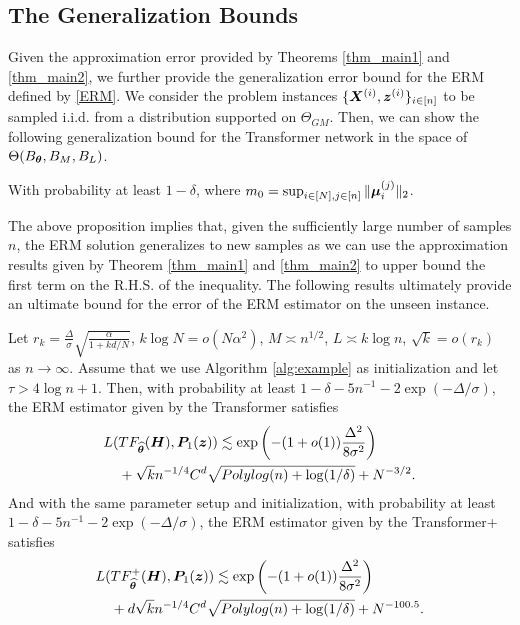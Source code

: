 \subsection{The Generalization Bounds}\label{approx2}
Given the approximation error provided by Theorems \ref{thm_main1} and \ref{thm_main2}, we further provide the generalization error bound for the ERM defined by \eqref{ERM}. We consider the problem instances $\{\boldsymbol{X}^{(i)},\boldsymbol{z}^{(i)} \}_{i\in[n]}$ to be sampled i.i.d. from a distribution supported on $\Theta_{GM}$. Then, we can show the following generalization bound for the Transformer network in the space of $\Theta(B_{\boldsymbol{\theta}},B_{M},B_{L})$.
\begin{proposition}\label{genbd}
    With probability at least $1-\delta$,
    where $m_0=\sup_{i\in[N],j\in[n]}\Vert\boldsymbol{\mu}_i^{(j)}\Vert_2$.
\end{proposition}
\begin{remark}
    The above proposition implies that, given the sufficiently large number of samples $n$, the ERM solution generalizes to new samples as we can use the approximation results given by Theorem \ref{thm_main1} and \ref{thm_main2} to upper bound the first term on the R.H.S. of the inequality. The following results ultimately provide an ultimate bound for the error of the ERM estimator on the unseen instance.
\end{remark}
\begin{theorem}\label{ultimate}
    Let $r_k=\frac{\Delta}{\sigma}\sqrt{\frac{\alpha}{1+kd/N}}$, $k\log N = o(N\alpha^2)$, $M\asymp n^{1/2}$, $L\asymp k\log n$, $\sqrt k=o(r_k)$ as $n\to\infty$. Assume that we use Algorithm \ref{alg:example} as initialization and let $\tau > 4\log n+1$. Then, with probability at least $1-\delta - 5n^{-1} - 2\exp(-\Delta/\sigma)$, the ERM estimator given by the Transformer satisfies
    \begin{align*}
    L(&TF_{\widehat{\boldsymbol{\theta}}}(\boldsymbol{H}),\boldsymbol{P}_1(\boldsymbol{z}))\lesssim \exp\left(-(1+o(1))\frac{\Delta^2}{8\sigma^2}\right)\\
    &+\sqrt kn^{-1/4}C^d\sqrt{Polylog(n)+\log(1/\delta)}+N^{-3/2}.
\end{align*}
And with the same parameter setup and initialization, with probability at least $1-\delta - 5n^{-1} - 2\exp(-\Delta/\sigma)$, the ERM estimator given by the Transformer+ satisfies
\begin{align*}
    L(&TF_{\widehat{\boldsymbol{\theta}}}^+(\boldsymbol{H}),\boldsymbol{P}_1(\boldsymbol{z}))\lesssim \exp\left(-(1+o(1))\frac{\Delta^2}{8\sigma^2}\right)\\
    &+d\sqrt kn^{-1/4}C^d\sqrt{Polylog(n)+\log(1/\delta)}+N^{-100.5}.
\end{align*}
\end{theorem}

